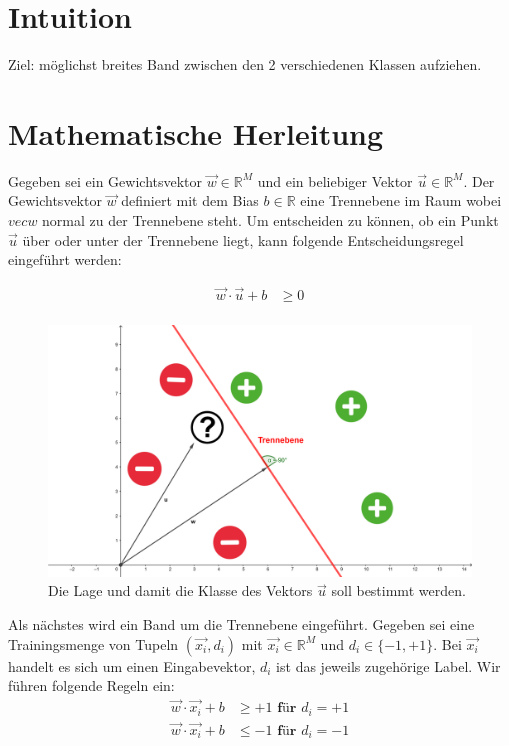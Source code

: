 \documentclass[a4paper,11pt,twoside]{scrreprt}
\begin{document}
\section{Intuition}
Ziel: möglichst breites Band zwischen den 2 verschiedenen Klassen aufziehen.

\section{Mathematische Herleitung}
Gegeben sei ein Gewichtsvektor $\vec{w} \in \mathbb{R}^{M}$ und ein beliebiger Vektor $\vec{u} \in \mathbb{R}^{M}$. Der Gewichtsvektor $\vec{w}$ definiert mit dem Bias $b \in \mathbb{R}$ eine Trennebene im Raum wobei $vec{w}$ normal zu der Trennebene steht. Um entscheiden zu können, ob ein Punkt $\vec{u}$ über oder unter der Trennebene liegt, kann folgende Entscheidungsregel eingeführt werden:

\begin{equation} \label{dec_rule}
    \begin{aligned}
    \vec{w} \cdot \vec{u} + b & \geq 0 \\
    \end{aligned}
\end{equation}


\begin{figure}[H]
	\centering
	\includegraphics{assets/trennebene.png}
	\caption{Die Lage und damit die Klasse des Vektors $\vec{u}$ soll bestimmt werden.}
	\label{fig:trennebene}
\end{figure}


Als nächstes wird ein Band um die Trennebene eingeführt. Gegeben sei eine Trainingsmenge von Tupeln $(\vec{x_{i}}, d_{i})$ mit $\vec{x_{i}} \in \mathbb{R}^{M}$ und $d_{i} \in \{-1, +1\}$. Bei $\vec{x_{i}}$ handelt es sich um einen Eingabevektor, $d_{i}$ ist das jeweils zugehörige Label. Wir führen folgende Regeln ein:
\begin{equation} \label{band_rules}
    \begin{aligned}
    \vec{w} \cdot \vec{x_{i}} + b & \geq +1 \textbf{ für $d_{i} = +1$} \\
    \vec{w} \cdot \vec{x_{i}} + b & \leq -1 \textbf{ für $d_{i} = -1$}
    \end{aligned}
\end{equation}
\end{document}
